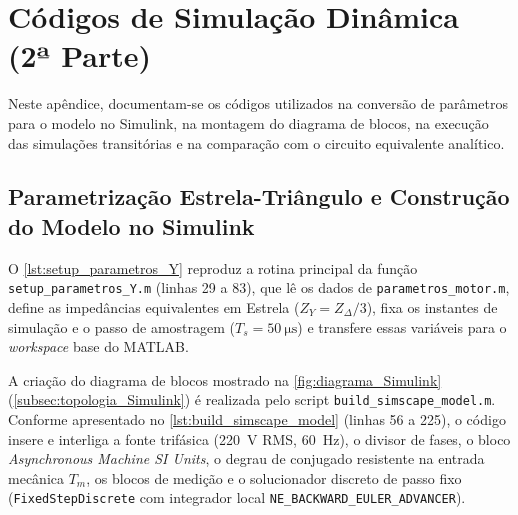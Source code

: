 \chapter{Códigos de Simulação Dinâmica (2ª Parte)}\label{anexo:codigos_parte2}

Neste apêndice, documentam-se os códigos utilizados na conversão de parâmetros para o modelo no Simulink, na montagem do diagrama de blocos, na execução das simulações transitórias e na comparação com o circuito equivalente analítico.

\section{Parametrização Estrela-Triângulo e Construção do Modelo no Simulink}\label{sec:codigo_simulink_construcao}

O \cref{lst:setup_parametros_Y} reproduz a rotina principal da função \texttt{setup\_\allowbreak{}parametros\_\allowbreak{}Y.m} (linhas 29 a 83), que lê os dados de \texttt{parametros\_\allowbreak{}motor.m}, define as impedâncias equivalentes em Estrela ($Z_Y = Z_\Delta / 3$), fixa os instantes de simulação e o passo de amostragem ($T_s = \SI{50}{\micro\second}$) e transfere essas variáveis para o \textit{workspace} base do MATLAB.



A criação do diagrama de blocos mostrado na \cref{fig:diagrama_Simulink} (\cref{subsec:topologia_Simulink}) é realizada pelo script \texttt{build\_\allowbreak{}simscape\_\allowbreak{}model.m}. Conforme apresentado no \cref{lst:build_simscape_model} (linhas 56 a 225), o código insere e interliga a fonte trifásica (\SI{220}{\volt} RMS, \SI{60}{\hertz}), o divisor de fases, o bloco \textit{Asynchronous Machine SI Units}, o degrau de conjugado resistente na entrada mecânica $T_m$, os blocos de medição e o solucionador discreto de passo fixo (\texttt{FixedStepDiscrete} com integrador local \texttt{NE\_BACKWARD\_EULER\_ADVANCER}).



